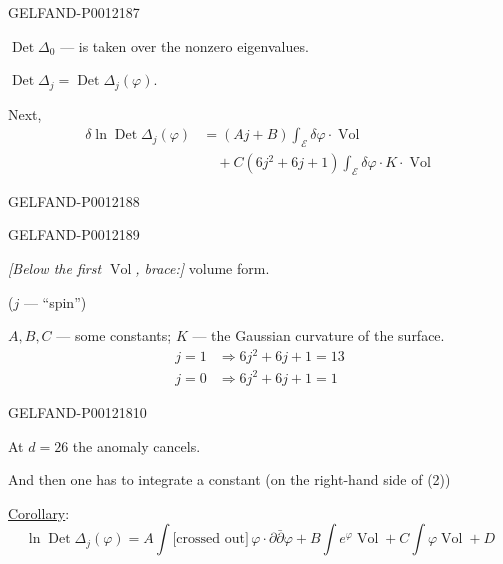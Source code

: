 \begin{GelfandAdjacentEvidence}{GELFAND-P001218}{7}


\(\operatorname{Det}\Delta_0\) --- is taken over the nonzero eigenvalues.

\(\operatorname{Det}\Delta_j=\operatorname{Det}\Delta_j(\varphi)\).

Next,
\begin{equation*}
\begin{aligned}
\delta\ln\operatorname{Det}\Delta_j(\varphi)
&=(Aj+B)\int_{\mathcal E}\delta\varphi\cdot\operatorname{Vol}\\
&\quad+C(6j^2+6j+1)\int_{\mathcal E}\delta\varphi\cdot K\cdot\operatorname{Vol}
\end{aligned}\tag{3}
\end{equation*}
\end{GelfandAdjacentEvidence}
\begin{GelfandAdjacentEvidence}{GELFAND-P001218}{8}

\end{GelfandAdjacentEvidence}
\begin{GelfandAdjacentEvidence}{GELFAND-P001218}{9}


\textit{[Below the first \(\operatorname{Vol}\), brace:]} volume form.

(\(j\) --- “spin”)

\(A,B,C\) --- some constants; \(K\) --- the Gaussian curvature of the surface.
\[
\begin{aligned}
j=1&\Rightarrow 6j^2+6j+1=13\\
j=0&\Rightarrow 6j^2+6j+1=1
\end{aligned}
\]
\end{GelfandAdjacentEvidence}
\begin{GelfandAdjacentEvidence}{GELFAND-P001218}{10}


At \(d=26\) the anomaly cancels.

And then one has to integrate a constant (on the right-hand side of (2))

\underline{Corollary}:
\begin{equation*}
\ln\operatorname{Det}\Delta_j(\varphi)
=A\int\text{[crossed out]}\,\varphi\cdot\partial\bar\partial\varphi
+B\int e^\varphi\operatorname{Vol}
+C\int\varphi\operatorname{Vol}+D\tag{4}
\end{equation*}
\end{GelfandAdjacentEvidence}



